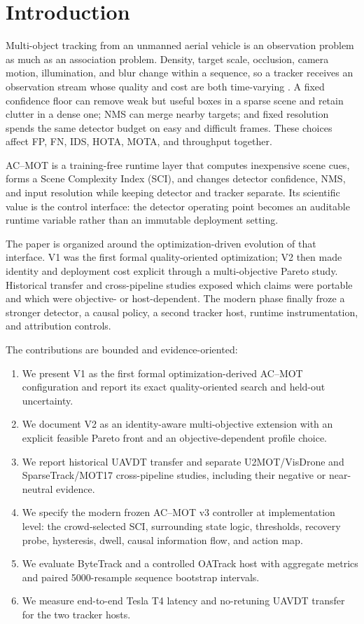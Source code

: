 \section{Introduction}
Multi-object tracking from an unmanned aerial vehicle is an observation problem
as much as an association problem. Density, target scale, occlusion, camera
motion, illumination, and blur change within a sequence, so a tracker receives
an observation stream whose quality and cost are both time-varying
\cite{zhu2022visdrone,du2018uavdt}. A fixed confidence floor can remove weak
but useful boxes in a sparse scene and retain clutter in a dense one; NMS can
merge nearby targets; and fixed resolution spends the same detector budget on
easy and difficult frames. These choices affect FP, FN, IDS, HOTA, MOTA, and
throughput together.

AC--MOT is a training-free runtime layer that computes inexpensive scene cues,
forms a Scene Complexity Index (SCI), and changes detector confidence, NMS, and
input resolution while keeping detector and tracker separate. Its scientific
value is the control interface: the detector operating point becomes an
auditable runtime variable rather than an immutable deployment setting.

The paper is organized around the optimization-driven evolution of that
interface. V1 was the first formal quality-oriented optimization;
V2 then made identity and deployment cost explicit through a multi-objective
Pareto study. Historical transfer and cross-pipeline studies exposed which
claims were portable and which were objective- or host-dependent. The modern
phase finally froze a stronger detector, a causal policy, a second tracker
host, runtime instrumentation, and attribution controls.

The contributions are bounded and evidence-oriented:
\begin{enumerate}
\item We present V1 as the first formal optimization-derived AC--MOT
      configuration and report its exact quality-oriented search and held-out
      uncertainty.
\item We document V2 as an identity-aware multi-objective extension with an
      explicit feasible Pareto front and an objective-dependent profile choice.
\item We report historical UAVDT transfer and separate U2MOT/VisDrone and
      SparseTrack/MOT17 cross-pipeline studies, including their negative or
      near-neutral evidence.
\item We specify the modern frozen AC--MOT v3 controller at implementation
      level: the
      crowd-selected SCI, surrounding state logic, thresholds, recovery probe,
      hysteresis, dwell, causal information flow, and action map.
\item We evaluate ByteTrack and a controlled OATrack host with aggregate metrics
      and paired 5000-resample sequence bootstrap intervals.
\item We measure end-to-end Tesla T4 latency and no-retuning UAVDT transfer
      for the two tracker hosts.
\end{enumerate}

